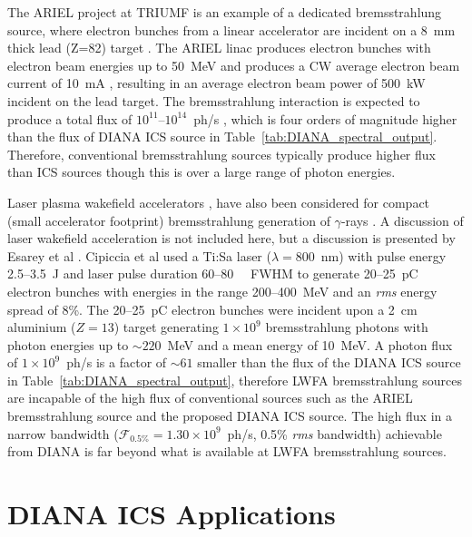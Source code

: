 \documentclass[../main.tex]{subfiles}
\begin{document}
The ARIEL project at TRIUMF \cite{dilling2013ariel} is an example of a dedicated bremsstrahlung source, where electron bunches from a linear accelerator are incident on a 8~\si{\milli\meter} thick lead (Z=82) target \cite{lebois2011simulations}. The ARIEL linac produces electron bunches with electron beam energies up to 50~\si{\mega\electronvolt} and produces a CW average electron beam current of 10~\si{\milli\ampere} \cite{dilling2013ariel}, resulting in an average electron beam power of 500~\si{\kilo\watt} incident on the lead target. The bremsstrahlung interaction is expected to produce a total flux of $10^{11}$--$10^{14}$~ph/\si{\second} \cite{lebois2011simulations}, which is four orders of magnitude higher than the flux of DIANA ICS source in Table~\ref{tab:DIANA_spectral_output}. Therefore, conventional bremsstrahlung sources typically produce higher flux than ICS sources though this is over a large range of photon energies. 

Laser plasma wakefield accelerators \cite{sprangle1988laser,esarey2009physics}, have also been considered for compact (small accelerator footprint) bremsstrahlung generation of $\gamma$-rays \cite{cipiccia2012tuneable,lemos2018bremsstrahlung}. A discussion of laser wakefield acceleration is not included here, but a discussion is presented by Esarey et al \cite{esarey2009physics}. Cipiccia et al \cite{cipiccia2012tuneable} used a Ti:Sa laser ($\lambda = 800$~\si{\nano\meter}) with pulse energy 2.5--3.5~\si{\joule} and laser pulse duration 60--80~\si{\femto\seconds} FWHM to generate 20--25~\si{\pico\coulomb} electron bunches with energies in the range 200--400~\si{\mega\electronvolt} and an \textit{rms} energy spread of 8\%. The 20--25~\si{\pico\coulomb} electron bunches were incident upon a 2~\si{\centi\meter} aluminium ($Z=13$) target generating $1\times 10^{9}$ bremsstrahlung photons with photon energies up to $\sim 220$~\si{\mega\electronvolt} and a mean energy of 10~\si{\mega\electronvolt}. A photon flux of $1\times 10^{9}$~ph/\si{\second} is a factor of $\sim 61$ smaller than the flux of the DIANA ICS source in Table~\ref{tab:DIANA_spectral_output}, therefore LWFA bremsstrahlung sources are incapable of the high flux of conventional sources such as the ARIEL bremsstrahlung source and the proposed DIANA ICS source. The high flux in a narrow bandwidth ($\mathcal{F}_{\mathrm{0.5\%}} = 1.30\times 10^{9}$~ph/\si{\second}, 0.5\% \textit{rms} bandwidth) achievable from DIANA is far beyond what is available at LWFA bremsstrahlung sources.    

\section{DIANA ICS Applications}
\label{sec:DIANA_ICS_applications}
\end{document}
